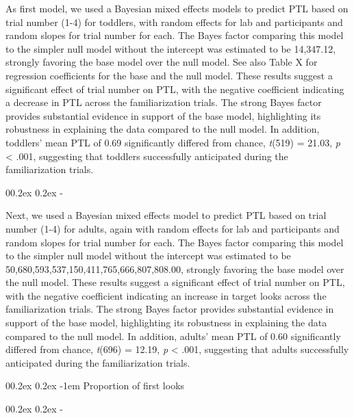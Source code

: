 \documentclass[
  english,
  man,floatsintext]{apa6}
\makeatletter
\let\oldparagraph\paragraph
\renewcommand{\paragraph}[1]{\oldparagraph{#1}\mbox{}}
\let\oldsubparagraph\subparagraph
\renewcommand{\subparagraph}[1]{\oldsubparagraph{#1}\mbox{}}
\renewcommand{\paragraph}{\@startsection{paragraph}{4}{\parindent}%
  {0\baselineskip \@plus 0.2ex \@minus 0.2ex}%
  {-1em}%
  {\normalfont\normalsize\bfseries\itshape\typesectitle}}
\renewcommand{\subparagraph}[1]{\@startsection{subparagraph}{5}{1em}%
  {0\baselineskip \@plus 0.2ex \@minus 0.2ex}%
  {-\z@\relax}%
  {\normalfont\normalsize\itshape\hspace{\parindent}{#1}\textit{\addperi}}{\relax}}
\makeatother
\begin{document}
As first model, we used a Bayesian mixed effects models to predict PTL based on trial number (1-4) for toddlers, with random effects for lab and participants and random slopes for trial number for each. The Bayes factor comparing this model to the simpler null model without the intercept was estimated to be 14,347.12, strongly favoring the base model over the null model. See also Table X for regression coefficients for the base and the null model. These results suggest a significant effect of trial number on PTL, with the negative coefficient indicating a decrease in PTL across the familiarization trials. The strong Bayes factor provides substantial evidence in support of the base model, highlighting its robustness in explaining the data compared to the null model.
In addition, toddlers' mean PTL of 0.69 significantly differed from chance, \emph{t}(519) = 21.03, \emph{p} \textless{} .001, suggesting that toddlers successfully anticipated during the familiarization trials.

\hypertarget{adults}{%
\subparagraph{Adults}\label{adults}}

Next, we used a Bayesian mixed effects model to predict PTL based on trial number (1-4) for adults, again with random effects for lab and participants and random slopes for trial number for each. The Bayes factor comparing this model to the simpler null model without the intercept was estimated to be 50,680,593,537,150,411,765,666,807,808.00, strongly favoring the base model over the null model. These results suggest a significant effect of trial number on PTL, with the negative coefficient indicating an increase in target looks across the familiarization trials. The strong Bayes factor provides substantial evidence in support of the base model, highlighting its robustness in explaining the data compared to the null model. In addition, adults' mean PTL of 0.60 significantly differed from chance, \emph{t}(696) = 12.19, \emph{p} \textless{} .001, suggesting that adults successfully anticipated during the familiarization trials.

\hypertarget{proportion-of-first-looks}{%
\paragraph{Proportion of first looks}\label{proportion-of-first-looks}}

\hypertarget{toddlers-1}{%
\subparagraph{Toddlers}\label{toddlers-1}}
\end{document}
